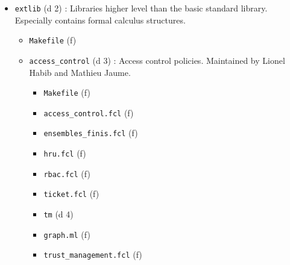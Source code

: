\begin{itemize}
\begin{itemize}
\begin{itemize}
    \item {\tt focdoc.xsd} (f) :
    \item {\tt focdoc2html.xsl} : Transforms some \focalizedoc-XML into
        HTML + MathML.
    \item {\tt focdoc2tex.xsl} (f) : Transforms some \focalizedoc-XML
        into \latex.
    \item {\tt main\_docgen.ml} (f) : Engine extracting information from
        a \focalize\ source code to produce \focalizedoc-XML.
    \item {\tt main\_docgen.mli} (f)
    \item {\tt mmlctop2\_0.xsl} (f) : Transforms HTML + MathML into
      HTML.
    \item {\tt proposition.xsl} (f) : : Processing of logical
      expressions from \focalizedoc-XML to HTML + MathML.
    \item {\tt proposition2tex.xsl} (f) : Processing of logical
      expressions from \focalizedoc-XML to \latex.
    \item {\tt utils\_docgen.ml} (f) : Various helpers used for XML
      production.
    \item {\tt tils\_docgen.mli} (f)
    \end{itemize}
  \item {\tt extlib} (d 2) : Libraries higher level than the basic
    standard library. Especially contains formal calculus structures.
    \begin{itemize}
    \item {\tt Makefile} (f)
    \item {\tt access\_control} (d 3) : Access control
      policies. Maintained by Lionel Habib and Mathieu Jaume.
      \begin{itemize}
      \item {\tt Makefile} (f)
      \item {\tt access\_control.fcl} (f)
      \item {\tt ensembles\_finis.fcl} (f)
      \item {\tt hru.fcl} (f)
      \item {\tt rbac.fcl} (f)
      \item {\tt ticket.fcl} (f)
      \item {\tt tm} (d 4)
        \item \hspace{0.7cm} {\tt graph.ml} (f)
        \item \hspace{0.7cm} {\tt trust\_management.fcl} (f)

\end{itemize}
\end{itemize}
\end{itemize}
\end{itemize}
